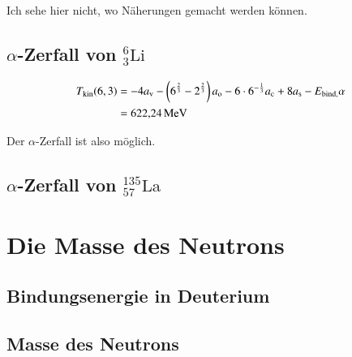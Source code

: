 Ich sehe hier nicht, wo Näherungen gemacht werden können.

\subsection{$\alpha$-Zerfall von $_3^6\text{Li}$}

\begin{align*}
    T_\text{kin}(6,3) &= -4a_\text{v}-\del{6^{\frac23}-2^{\frac23}}a_\text{o}
    -6\cdot6^{-\frac13}a_\text{c}+8a_\text{s}-E_\text{bind,}\alpha \\
    &= \SI{622.24}{\mega\electronvolt}
\end{align*}

Der $\alpha$-Zerfall ist also möglich.

\subsection{$\alpha$-Zerfall von $_{57}^{135}\text{La}$}

\section{Die Masse des Neutrons}
\subsection{Bindungsenergie in Deuterium}
\subsection{Masse des Neutrons}


